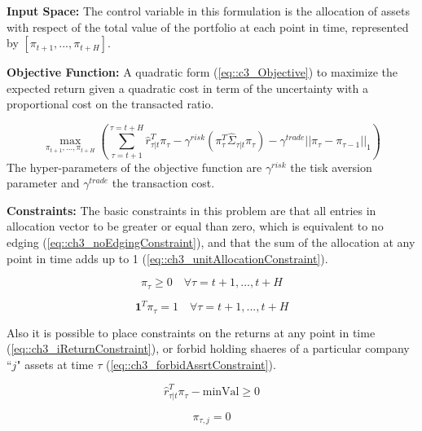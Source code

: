 \textbf{Input Space:} The control variable in this formulation is the allocation of assets with respect of the total value of the portfolio at each point in time, represented by $\left[\pi_{t+1},...,\pi_{t+H}\right]$.

\textbf{Objective Function:} A quadratic form (\ref{eq::c3_Objective}) to maximize the expected return given a quadratic cost in term of the uncertainty with a proportional cost on the transacted ratio.

\begin{equation} \label{eq::c3_Objective}
\max_{\pi_{t+1},...,\pi_{t+H}} \left(\sum_{\tau=t+1}^{\tau=t+H} \hat{r}^{T}_{\tau|t}\pi_{\tau} 
- \gamma^{risk}\left(\pi_{\tau}^T \hat{\Sigma}_{\tau|t}\pi_{\tau}\right) 
- \gamma^{trade}||\pi_{\tau}-\pi_{\tau-1}||_1
\right)
\end{equation}
The hyper-parameters of the objective function are $\gamma^{risk}$ the tisk aversion parameter and $\gamma^{trade}$ the transaction cost.


\textbf{Constraints:} The basic constraints in this problem are that all entries in allocation vector to be greater or equal than zero, which is equivalent to no edging (\ref{eq::ch3_noEdgingConstraint}), and that the sum of the allocation at any point in time adds up to 1 (\ref{eq::ch3_unitAllocationConstraint}).

\begin{equation}\label{eq::ch3_noEdgingConstraint}
\pi_{\tau}\geq 0\quad \forall\tau=t+1,...,t+H
\end{equation}

\begin{equation}\label{eq::ch3_unitAllocationConstraint}
\textbf{1}^T\pi_{\tau}=1 \quad \forall\tau=t+1,...,t+H
\end{equation}

Also it is possible to place constraints on the returns at any point in time (\ref{eq::ch3_iReturnConstraint}), or forbid holding shaeres of a particular company ``$j$" assets at time $\tau$ (\ref{eq::ch3_forbidAssrtConstraint}).

\begin{equation}\label{eq::ch3_iReturnConstraint}
 \hat{r}^{T}_{\tau|t} \pi_{\tau} - \text{minVal} \geq 0
\end{equation}

\begin{equation}\label{eq::ch3_forbidAssrtConstraint}
  \pi_{\tau,j} = 0 
\end{equation}



